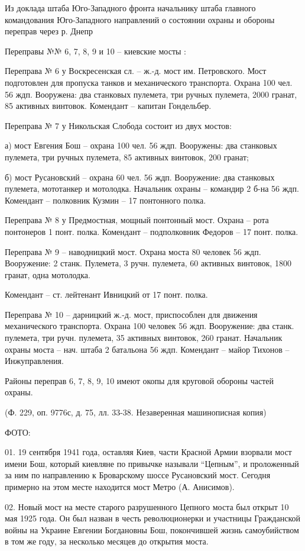 Из доклада штаба Юго-Западного фронта начальнику штаба главного командования
Юго-Западного направлений о состоянии охраны и обороны переправ через р. Днепр

Переправы №№ 6, 7, 8, 9 и 10 – киевские мосты :

Переправа № 6 у Воскресенская сл. – ж.-д. мост им. Петровского. Мост
подготовлен для пропуска танков и механического транспорта. Охрана 100 чел. 56
ждп. Вооружена: два станковых пулемета, три ручных пулемета, 2000 гранат, 85
активных винтовок. Комендант – капитан Гондельбер.

Переправа № 7 у Никольская Слобода состоит из двух мостов:

а) мост Евгения Бош – охрана 100 чел. 56 ждп. Вооружены: два станковых
пулемета, три ручных пулемета, 85 активных винтовок, 200 гранат;

б) мост Русановский – охрана 60 чел. 56 ждп. Вооружение: два станковых
пулемета, мототанкер и мотолодка. Начальник охраны – командир 2 б-на 56 ждп.
Комендант – полковник Кузмин – 17 понтонного полка.

Переправа № 8 у Предмостная, мощный понтонный мост. Охрана – рота понтонеров 1
понт. полка. Комендант – подполковник Федоров – 17 понт. полка.

Переправа № 9 – наводницкий мост. Охрана моста 80 человек 56 ждп. Вооружение: 2
станк. Пулемета, 3 ручн. пулемета, 60 активных винтовок, 1800 гранат, одна
мотолодка.

Комендант – ст. лейтенант Ивницкий от 17 понт. полка.

Переправа № 10 – дарницкий ж.-д. мост, приспособлен для движения механического
транспорта. Охрана 100 человек 56 ждп. Вооружение: два станк. пулемета, три
ручн. пулемета, 35 активных винтовок, 260 гранат. Начальник охраны моста – нач.
штаба 2 батальона 56 ждп. Комендант – майор Тихонов – Инжуправления.

Районы переправ 6, 7, 8, 9, 10 имеют окопы для круговой обороны частей охраны.

(Ф. 229, оп. 9776с, д. 75, лл. 33-38. Незаверенная машинописная копия)

ФОТО:

01. 19 сентября 1941 года, оставляя Киев, части Красной Армии взорвали мост
имени Бош, который киевляне по привычке называли \enquote{Цепным}, и проложенный за ним
по направлению к Броварскому шоссе Русановский мост. Сегодня примерно на этом
месте находится мост Метро (А. Анисимов).

02. Новый мост на месте старого разрушенного Цепного моста был открыт 10 мая
1925 года. Он был назван в честь революционерки и участницы Гражданской войны
на Украине Евгении Богдановны Бош, покончившей жизнь самоубийством в том же
году, за несколько месяцев до открытия моста.


